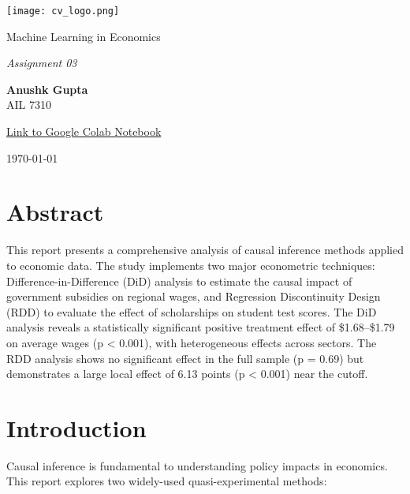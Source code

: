 \documentclass[a4paper,12pt,headsepline]{scrartcl} %
\begin{document}
\begin{titlepage}
    \centering
    \vspace*{2cm} %
    
    \texttt{[image: cv\_logo.png]} %
    
    \vspace{1cm} %
    
    {\huge\color{IITJBlue} Machine Learning in Economics}
    
    \vspace{0.5cm}
    
    {\Large\itshape Assignment 03}
    
    \vfill %
    
    {\large\bfseries Anushk Gupta} \\
    {\mdseries AIL 7310}
    
    \vspace{0.8cm}
    
    {\large \href{https://colab.research.google.com/drive/1gCpk-J7ZFCZzIAV6karfv8xuHTEOVyvK?usp=sharing}{\color{HyperlinkBlue}Link to Google Colab Notebook}}
    
    \vspace{1.5cm}
    
    {\large \today}
    
\end{titlepage}

\tableofcontents
\newpage

\section{Abstract}
This report presents a comprehensive analysis of causal inference methods applied to economic data. The study implements two major econometric techniques: Difference-in-Difference (DiD) analysis to estimate the causal impact of government subsidies on regional wages, and Regression Discontinuity Design (RDD) to evaluate the effect of scholarships on student test scores. The DiD analysis reveals a statistically significant positive treatment effect of \$1.68--\$1.79 on average wages (p < 0.001), with heterogeneous effects across sectors. The RDD analysis shows no significant effect in the full sample (p = 0.69) but demonstrates a large local effect of 6.13 points (p < 0.001) near the cutoff.

\section{Introduction}
Causal inference is fundamental to understanding policy impacts in economics. This report explores two widely-used quasi-experimental methods:
\end{document}
